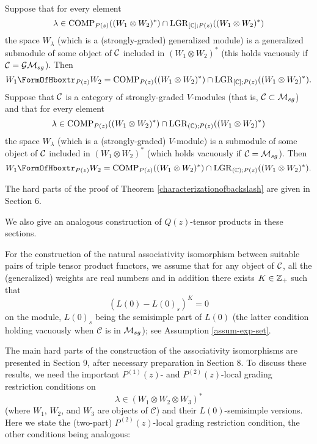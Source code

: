 \documentclass[12pt]{article}
\begin{document}
\setcounter{rema}{49}
\begin{theo}
Suppose that for every element 
\[
\lambda
\in \mathrm{COMP}_{P(z)}((W_1\otimes W_2)^*)\cap \mathrm{LGR}_{[\mathbb{C}]; P(z)}((W_1\otimes W_2)^*)
\]
the space $W_{\lambda}$ (which is a (strongly-graded) generalized
module) is a generalized submodule of some object of ${\cal C}$
included in $(W_1\otimes W_2)^*$ (this holds vacuously if ${\cal C} =
{\cal GM}_{sg}$).  Then
\[
W_1\hboxtr_{P(z)}W_2=\comp_{P(z)}((W_1\otimes W_2)^*)
\cap \lgr_{[\C]; P(z)}((W_1\otimes W_2)^*).
\]
Suppose that ${\cal C}$ is a category of strongly-graded $V$-modules
(that is, ${\cal C}\subset {\cal M}_{sg}$) and that for every element
\[
\lambda
\in \mathrm{COMP}_{P(z)}((W_1\otimes W_2)^*)\cap \mathrm{LGR}_{(\mathbb{C}); P(z)}((W_1\otimes W_2)^*)
\]
the space $W_{\lambda}$ (which is a (strongly-graded) $V$-module) is a
submodule of some object of ${\cal C}$ included in $(W_1\otimes
W_2)^*$ (which holds vacuously if ${\cal C} = {\cal M}_{sg}$).  Then
\[
W_1\hboxtr_{P(z)}W_2=\comp_{P(z)}((W_1\otimes W_2)^*)
\cap \lgr_{(\C); P(z)}((W_1\otimes W_2)^*).
\]
\end{theo}

The hard parts of the proof of Theorem
\ref{characterizationofbackslash} are given in Section 6.

We also give an analogous construction of $Q(z)$-tensor products in
these sections.

For the construction of the natural associativity isomorphism between
suitable pairs of triple tensor product functors, we assume that for
any object of ${\cal C}$, all the (generalized) weights are real
numbers and in addition there exists $K\in \mathbb{Z}_{+}$ such that
\[
(L(0)-L(0)_{s})^{K}=0
\]
on the module, $L(0)_{s}$ being the semisimple part of $L(0)$ (the
latter condition holding vacuously when $\mathcal{C}$ is in ${\cal
M}_{sg}$); see Assumption \ref{assum-exp-set}.

The main hard parts of the construction of the associativity
isomorphisms are presented in Section 9, after necessary preparation
in Section 8.  To discuss these results, we need the important
$P^{(1)}(z)$- and $P^{(2)}(z)$-local grading restriction conditions on
\[
\lambda\in (W_{1}\otimes W_{2}\otimes W_{3})^{*}
\]
(where $W_{1}$, $W_{2}$, and $W_{3}$ are objects of $\mathcal{C}$)
and their $L(0)$-semisimple versions. 
Here we state the (two-part) $P^{(2)}(z)$-local grading 
restriction condition, the other conditions being analogous: 
\end{document}
